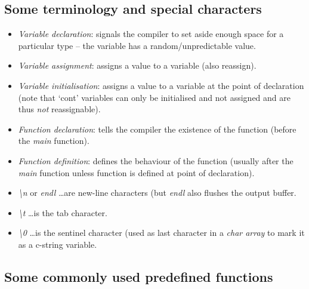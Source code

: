 \subsection{Some terminology and special characters}
\begin{itemize}
	\item \emph{Variable declaration}: signals the compiler to set aside enough space for a
	particular type -- the variable has a random/unpredictable value.
	\item \emph{Variable assignment}: assigns a value to a variable (also reassign).
	\item \emph{Variable initialisation}: assigns a value to a variable at the point of declaration (note
	that `cont' variables can only be initialised and not assigned and are thus \emph{not} reassignable).
	\item \emph{Function declaration}: tells the compiler the existence of the function (before the
	\emph{main} function).
	\item \emph{Function definition}: defines the behaviour of the function (usually after the
	\emph{main} function unless function is defined at point of declaration).
	\item \emph{\textbackslash{}n} or \emph{endl} \ldots are new-line characters (but \emph{endl} also
	flushes the output buffer.
	\item \emph{\textbackslash{}t} \ldots is the tab character.
	\item \emph{\textbackslash{}0} \ldots is the sentinel character (used as last character in a \emph{char array}
	to mark it as a c-string variable.
\end{itemize}


\subsection{Some commonly used predefined functions}


